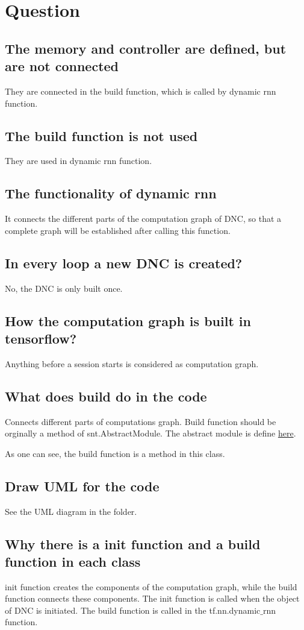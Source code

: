 \documentclass{article}
\begin{document}
\section{Question}
\subsection{The memory and controller are defined, but are not connected}
They are connected in the build function, which is called by dynamic rnn function.
\subsection{The build function is not used}
They are used in dynamic rnn function.
\subsection{The functionality of dynamic rnn}
It connects the different parts of the computation graph of DNC, so that a complete graph will be established after calling this function.
\subsection{In every loop a new DNC is created?}
No, the DNC is only built once. 
\subsection{How the computation graph is built in tensorflow?}
Anything before a session starts is considered as computation graph.
\subsection{What does build do in the code}
Connects different parts of computations graph. Build function should be orginally a method of snt.AbstractModule. The abstract module is define 
\href{https://github.com/deepmind/sonnet/blob/master/sonnet/python/modules/base.py}{here}.

As one can see, the build function is a method in this class.
\subsection{Draw UML for the code}
See the UML diagram in the folder.
\subsection{Why there is a init function and a build function in each class}
init function creates the components of the computation graph, while the build function connects these components. The init function is called when the object of DNC is initiated. The build function is called in the tf.nn.dynamic$\_$rnn function.
\end{document}
